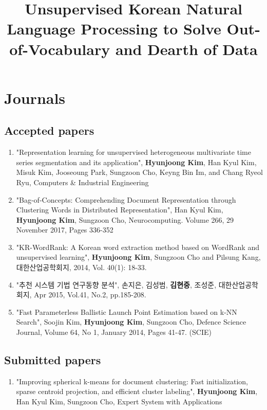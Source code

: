 \documentclass[11pt]{article}
\begin{document}
\title{Unsupervised Korean Natural Language Processing to Solve Out-of-Vocabulary and Dearth of Data}

\maketitle
\smallskip


\section{Journals}

\subsection{Accepted papers}

\begin{enumerate}
    \item "Representation learning for unsupervised heterogeneous multivariate time series segmentation and its application", \textbf{Hyunjoong Kim}, Han Kyul Kim, Misuk Kim, Jooseoung Park, Sungzoon Cho, Keyng Bin Im, and Chang Ryeol Ryu, Computers \& Industrial Engineering
    \item "Bag-of-Concepts: Comprehending Document Representation through Clustering Words in Distributed Representation", Han Kyul Kim,  \textbf{Hyunjoong Kim}, Sungzoon Cho, Neurocomputing. Volume 266, 29 November 2017, Pages 336-352
    \item "KR-WordRank: A Korean word extraction method based on WordRank and unsupervised learning",  \textbf{Hyunjoong Kim}, Sungzoon Cho and Pilsung Kang, 대한산업공학회지, 2014, Vol. 40(1): 18-33.
    \item "추천 시스템 기법 연구동향 분석", 손지은, 김성범,  \textbf{김현중}, 조성준, 대한산업공학회지, Apr 2015, Vol.41, No.2, pp.185-208.
    \item "Fast Parameterless Ballistic Launch Point Estimation based on k-NN Search", Soojin Kim,  \textbf{Hyunjoong Kim}, Sungzoon Cho, Defence Science Journal, Volume 64, No 1, January 2014, Pages 41-47. (SCIE)
\end{enumerate}

\subsection{Submitted papers}

\begin{enumerate}
    \item "Improving spherical k-means for document clustering: Fast initialization, sparse centroid projection, and efficient cluster labeling", \textbf{Hyunjoong Kim}, Han Kyul Kim, Sungzoon Cho, Expert System with Applications
\end{enumerate}
\end{document}
